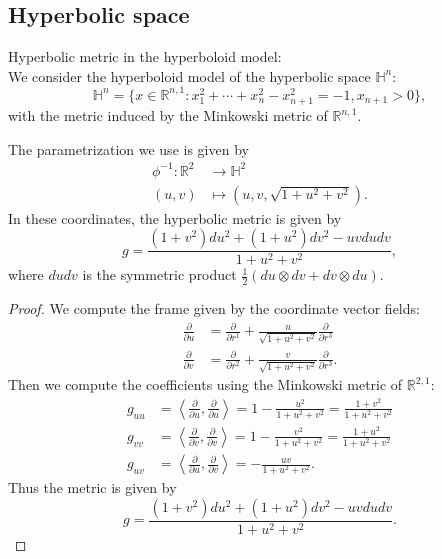 \documentclass{report}
\begin{document}
\subsection{Hyperbolic space}
Hyperbolic metric in the hyperboloid model:\\
    We consider the hyperboloid model of the hyperbolic space $\mathbb H^n$:
    \[
    \mathbb H^n = \{x \in \mathbb R^{n,1}: x_1^2 + \cdots + x_n^2 - x_{n+1}^2 = -1, x_{n+1} > 0\},
    \]
    with the metric induced by the Minkowski metric of $\mathbb R^{n,1}$.
    
    The parametrization we use is given by
    \begin{align*}
        \phi^{-1}: \mathbb R^2 &\to \mathbb H^2\\
        (u,v) &\mapsto (u, v, \sqrt{1 + u^2 + v^2}).
    \end{align*}
    In these coordinates, the hyperbolic metric is given by
    \[
    g = \frac{(1 + v^2) du^2 + (1 + u^2) dv^2 - uv du dv}{1 + u^2 + v^2},
    \]
    where $du dv$ is the symmetric product $\frac{1}{2}(du \otimes dv + dv \otimes du)$.
    \begin{proof}
        We compute the frame given by the coordinate vector fields:
        \begin{align*}
            \frac{\partial}{\partial u} &= \frac{\partial}{\partial r^1} + \frac{u}{\sqrt{1 + u^2 + v^2}} \frac{\partial}{\partial r^3}\\
            \frac{\partial}{\partial v} &= \frac{\partial}{\partial r^2} + \frac{v}{\sqrt{1 + u^2 + v^2}} \frac{\partial}{\partial r^3}.
        \end{align*}
        Then we compute the coefficients using the Minkowski metric of $\mathbb R^{2,1}$:
    \begin{align*}
        g_{uu} &= \left\langle \frac{\partial}{\partial u}, \frac{\partial}{\partial u} \right\rangle = 1 - \frac{u^2}{1 + u^2 + v^2} = \frac{1 + v^2}{1 + u^2 + v^2}\\
        g_{vv} &= \left\langle \frac{\partial}{\partial v}, \frac{\partial}{\partial v} \right\rangle = 1 - \frac{v^2}{1 + u^2 + v^2} = \frac{1 + u^2}{1 + u^2 + v^2}\\
        g_{uv} &= \left\langle \frac{\partial}{\partial u}, \frac{\partial}{\partial v} \right\rangle = - \frac{uv}{1 + u^2 + v^2}.
    \end{align*}
    Thus the metric is given by
    \[
    g = \frac{(1 + v^2) du^2 + (1 + u^2) dv^2 - uv du dv}{1 + u^2 + v^2}.
    \]
    \end{proof}
\end{document}
